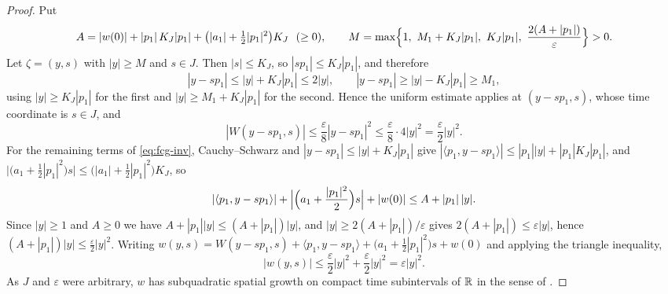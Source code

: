 \begin{proof}
Put
\[
  A=|w(0)|+|p_1|\,K_J|p_1|+\bigl(|a_1|+\tfrac12|p_1|^2\bigr)K_J\ \ (\ge0),
  \qquad
  M=\max\Bigl\{1,\ M_1+K_J|p_1|,\ K_J|p_1|,\
     \frac{2(A+|p_1|)}{\varepsilon}\Bigr\}>0 .
\]
Let $\zeta=(y,s)$ with $|y|\ge M$ and $s\in J$. Then $|s|\le K_J$, so
$|sp_1|\le K_J|p_1|$, and therefore
\[
  |y-sp_1|\le|y|+K_J|p_1|\le2|y|,\qquad
  |y-sp_1|\ge|y|-K_J|p_1|\ge M_1 ,
\]
using $|y|\ge K_J|p_1|$ for the first and $|y|\ge M_1+K_J|p_1|$ for the second.
Hence the uniform estimate applies at $(y-sp_1,s)$, whose time coordinate is
$s\in J$, and
\[
  |W(y-sp_1,s)|\le\frac{\varepsilon}{8}|y-sp_1|^2
   \le\frac{\varepsilon}{8}\cdot4|y|^2=\frac{\varepsilon}{2}|y|^2 .
\]
For the remaining terms of \eqref{eq:fcg-inv}, Cauchy--Schwarz and
$|y-sp_1|\le|y|+K_J|p_1|$ give
$|\langle p_1,y-sp_1\rangle|\le|p_1||y|+|p_1|K_J|p_1|$, and
$\bigl|\bigl(a_1+\tfrac12|p_1|^2\bigr)s\bigr|\le
\bigl(|a_1|+\tfrac12|p_1|^2\bigr)K_J$, so
\[
  |\langle p_1,y-sp_1\rangle|
   +\Bigl|\Bigl(a_1+\frac{|p_1|^2}{2}\Bigr)s\Bigr|+|w(0)|
  \le A+|p_1|\,|y| .
\]
Since $|y|\ge1$ and $A\ge0$ we have $A+|p_1||y|\le(A+|p_1|)|y|$, and
$|y|\ge2(A+|p_1|)/\varepsilon$ gives $2(A+|p_1|)\le\varepsilon|y|$, hence
$(A+|p_1|)|y|\le\tfrac{\varepsilon}{2}|y|^2$. Writing
$w(y,s)=W(y-sp_1,s)+\langle p_1,y-sp_1\rangle
 +\bigl(a_1+\tfrac12|p_1|^2\bigr)s+w(0)$ and applying the triangle inequality,
\[
  |w(y,s)|\le\frac{\varepsilon}{2}|y|^2+\frac{\varepsilon}{2}|y|^2
   =\varepsilon|y|^2 .
\]
As $J$ and $\varepsilon$ were arbitrary, $w$ has subquadratic spatial growth on
compact time subintervals of $\mathbb{R}$ in the sense of
. \end{proof}
